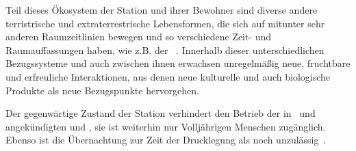\begin{newstuff}
    Teil dieses Ökosystem der Station und ihrer Bewohner sind diverse andere terristrische und extraterrestrische Lebensformen, die sich auf mitunter sehr anderen Raumzeitlinien bewegen und so verschiedene Zeit- und Raumauffassungen haben, wie z.B. der ~\cite{symbiont}. Innerhalb dieser unterschiedlichen Bezugssysteme und auch zwischen ihnen erwachsen unregelmäßig neue, fruchtbare und erfreuliche Interaktionen, aus denen neue kulturelle und auch biologische Produkte als neue Bezugspunkte hervorgehen. 

    Der gegenwärtige Zustand der Station verhindert den Betrieb der in~\cite{ctour} und~\cite{cbasestarbasemanual} angekündigten  und , sie ist weiterhin nur Volljährigen Menschen zugänglich. Ebenso ist die Übernachtung zur Zeit der Drucklegung als  noch unzulässig~\cite[S. 58]{cbasebook}.
\end{newstuff}
